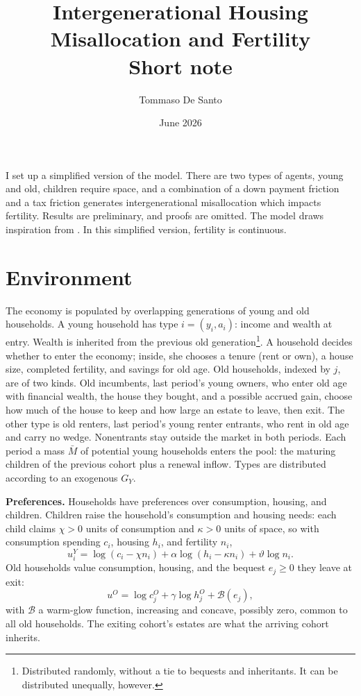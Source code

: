 \documentclass[11pt]{article}
\title{Intergenerational Housing Misallocation and Fertility\\[-0.1em]
\large Short note}
\author{Tommaso De Santo}
\date{June 2026}
\begin{document}
\maketitle
I set up a simplified version of the model. There are two types of agents, young and old, children require space, and a combination of a down payment friction and a tax friction generates intergenerational misallocation which impacts fertility. Results are preliminary, and proofs are omitted. The model draws inspiration from \citet{coven2024}. In this simplified version, fertility is continuous.

\section{Environment}

The economy is populated by overlapping generations of young and old households. A young household has type $i=(y_i,a_i)$: income and wealth at entry. Wealth is inherited from the previous old generation\footnote{Distributed randomly, without a tie to bequests and inheritants. It can be distributed unequally, however.}. A household decides whether to enter the economy; inside, she chooses a tenure (rent or own), a house size, completed fertility, and savings for old age. Old households, indexed by $j$, are of two kinds. Old incumbents, last period's young owners, who enter old age with financial wealth, the house they bought, and a possible accrued gain, choose how much of the house to keep and how large an estate to leave, then exit. The other type is old renters, last period's young renter entrants, who rent in old age and carry no wedge. Nonentrants stay outside the market in both periods. Each period a mass $\bar M$ of potential young households enters the pool: the maturing children of the previous cohort plus a renewal inflow. Types are distributed according to an exogenous $G_Y$.

\textbf{Preferences.} Households have preferences over consumption, housing, and children. Children raise the household's consumption and housing needs: each child claims $\chi>0$ units of consumption and $\kappa>0$ units of space, so with consumption spending $c_i$, housing $h_i$, and fertility $n_i$,
\[
u_i^Y=\log(c_i-\chi n_i)+\alpha\log(h_i-\kappa n_i)+\vartheta\log n_i .
\]
Old households value consumption, housing, and the bequest $e_j\ge0$ they leave at exit:
\[
u^O=\log c_j^O+\gamma\log h_j^O+\mathcal B(e_j),
\]
with $\mathcal B$ a warm-glow function, increasing and concave, possibly zero, common to all old households. The exiting cohort's estates are what the arriving cohort inherits. 
\end{document}
